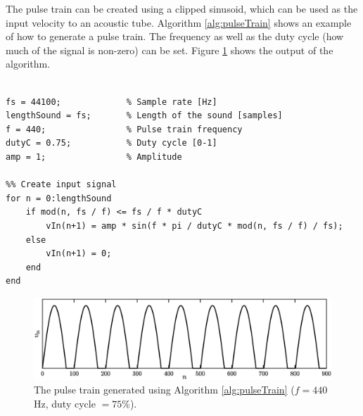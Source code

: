 The pulse train can be created using a clipped sinusoid, which can be used as the input velocity to an acoustic tube. Algorithm \ref{alg:pulseTrain} shows an example of how to generate a pulse train. The frequency as well as the duty cycle (how much of the signal is non-zero) can be set. Figure \ref{fig:pulseTrain} shows the output of the algorithm.
\\
\noindent
\begin{minipage}{\textwidth}
\setlstMAT
\begin{lstlisting}[caption={\texttt{MATLAB} code to generate a pulse train}, label=alg:pulseTrain]
%% Pulse train generator

fs = 44100;             % Sample rate [Hz]
lengthSound = fs;       % Length of the sound [samples]
f = 440;                % Pulse train frequency
dutyC = 0.75;           % Duty cycle [0-1]
amp = 1;                % Amplitude

%% Create input signal
for n = 0:lengthSound
    if mod(n, fs / f) <= fs / f * dutyC
        vIn(n+1) = amp * sin(f * pi / dutyC * mod(n, fs / f) / fs);
    else
        vIn(n+1) = 0;
    end
end
\end{lstlisting}
\end{minipage}

\begin{figure}[h]
    \centering
    \includegraphics[width=\textwidth]{figures/exciters/physInsp/pulseTrain.eps}
    \caption{The pulse train generated using Algorithm \ref{alg:pulseTrain} ($f = 440$ Hz, duty cycle $ = 75\%$).
    \label{fig:pulseTrain}}
\end{figure}